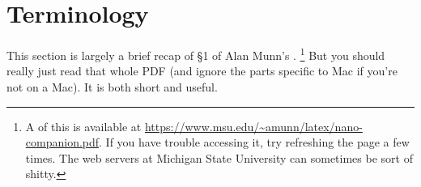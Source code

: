 
\section{Terminology}
\label{sec:terminology}

This section is largely a brief recap of \S1 of Alan Munn's .%
\footnote{%
A  of this is available at \url{https://www.msu.edu/~amunn/latex/nano-companion.pdf}.
If you have trouble accessing it, try refreshing the page a few times.
The web servers at Michigan State University can sometimes be sort of shitty.%
}
But you should really just read that whole PDF (and ignore the parts specific to Mac if you're not on a Mac).
It is both short and useful.

